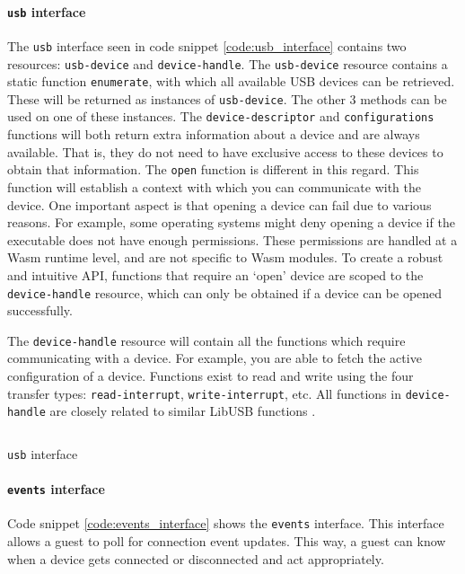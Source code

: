 \paragraph{\texttt{usb} interface}
The \texttt{usb} interface seen in code snippet \ref{code:usb_interface} contains two resources: \texttt{usb-device} and \texttt{device-handle}. The \texttt{usb-device} resource contains a static function \texttt{enumerate}, with which all available USB devices can be retrieved. These will be returned as instances of \texttt{usb-device}. The other 3 methods can be used on one of these instances. The \texttt{device-descriptor} and \texttt{configurations} functions will both return extra information about a device and are always available. That is, they do not need to have exclusive access to these devices to obtain that information. The \texttt{open} function is different in this regard. This function will establish a context with which you can communicate with the device. One important aspect is that opening a device can fail due to various reasons. For example, some operating systems might deny opening a device if the executable does not have enough permissions. These permissions are handled at a \acrshort{Wasm} runtime level, and are not specific to \acrshort{Wasm} modules. To create a robust and intuitive API, functions that require an `open' device are scoped to the \texttt{device-handle} resource, which can only be obtained if a device can be opened successfully.

The \texttt{device-handle} resource will contain all the functions which require communicating with a device. For example, you are able to fetch the active configuration of a device. Functions exist to read and write using the four transfer types: \texttt{read-interrupt}, \texttt{write-interrupt}, etc. All functions in \texttt{device-handle} are closely related to similar LibUSB functions \cite{libusb_docs}. 

\begin{code}
\inputminted[breaklines]{text}{WIT/wit/device.wit}
\caption{\texttt{usb} interface}
\label{code:usb_interface}
\end{code}

\paragraph{\texttt{events} interface}

Code snippet \ref{code:events_interface} shows the \texttt{events} interface. This interface allows a guest to poll for connection event updates. This way, a guest can know when a device gets connected or disconnected and act appropriately.

